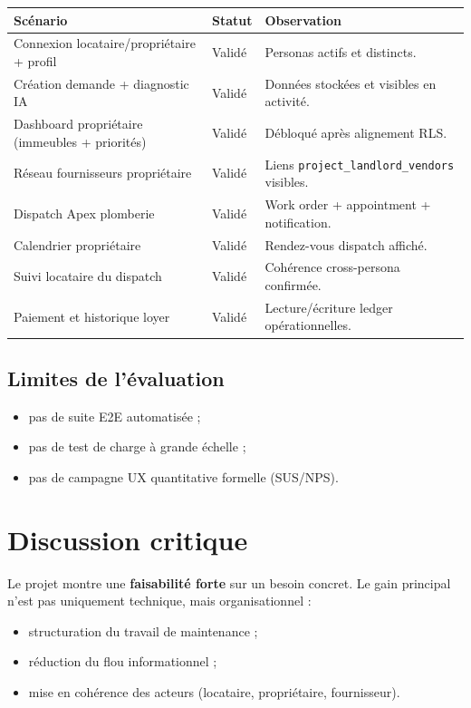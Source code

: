 \documentclass[11pt,a4paper]{article}
\begin{document}
\begin{longtable}{>{\raggedright\arraybackslash}p{7.5cm} >{\centering\arraybackslash}p{2.5cm} >{\raggedright\arraybackslash}p{5cm}}
\toprule
\textbf{Scénario} & \textbf{Statut} & \textbf{Observation}\\
\midrule
Connexion locataire/propriétaire + profil & Validé & Personas actifs et distincts.\\
Création demande + diagnostic IA & Validé & Données stockées et visibles en activité.\\
Dashboard propriétaire (immeubles + priorités) & Validé & Débloqué après alignement RLS.\\
Réseau fournisseurs propriétaire & Validé & Liens \texttt{project\_landlord\_vendors} visibles.\\
Dispatch Apex plomberie & Validé & Work order + appointment + notification.\\
Calendrier propriétaire & Validé & Rendez-vous dispatch affiché.\\
Suivi locataire du dispatch & Validé & Cohérence cross-persona confirmée.\\
Paiement et historique loyer & Validé & Lecture/écriture ledger opérationnelles.\\
\bottomrule
\end{longtable}

\subsection{Limites de l'évaluation}

\begin{itemize}[leftmargin=1.4em]
  \item pas de suite E2E automatisée ;
  \item pas de test de charge à grande échelle ;
  \item pas de campagne UX quantitative formelle (SUS/NPS).
\end{itemize}

\section{Discussion critique}

Le projet montre une \textbf{faisabilité forte} sur un besoin concret. Le gain principal n'est pas uniquement technique, mais organisationnel :

\begin{itemize}[leftmargin=1.4em]
  \item structuration du travail de maintenance ;
  \item réduction du flou informationnel ;
  \item mise en cohérence des acteurs (locataire, propriétaire, fournisseur).
\end{itemize}
\end{document}
